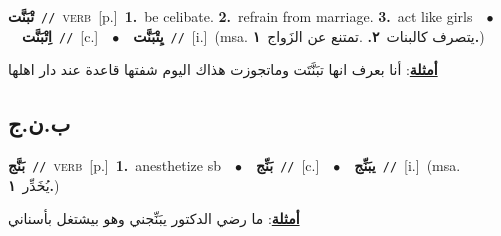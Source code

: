 \documentclass[10pt,a4paper,twoside]{article} %
\begin{document}
\begin{multicols}{2}
{\setlength\topsep{0pt}\textbf{\foreignlanguage{arabic}{تْبَنَّت}}\ {\color{gray}\texttt{//}\color{black}}\ \textsc{verb}\ [p.]\ \textbf{1.}~be celibate.  \textbf{2.}~refrain from marriage.  \textbf{3.}~act like girls\ \ $\bullet$\ \ \setlength\topsep{0pt}\textbf{\foreignlanguage{arabic}{اِتْبَنَّت}}\ {\color{gray}\texttt{//}\color{black}}\ [c.]\ \ $\bullet$\ \ \setlength\topsep{0pt}\textbf{\foreignlanguage{arabic}{يِتْبَنَّت}}\ {\color{gray}\texttt{//}\color{black}}\ [i.]\ \color{gray}(msa. \foreignlanguage{arabic}{يتصرف كالبنات}~\foreignlanguage{arabic}{\textbf{٢.}}  .\foreignlanguage{arabic}{تمتنع عن الزَواج}~\foreignlanguage{arabic}{\textbf{١.}})\color{black}\  \begin{flushright}\color{gray}\foreignlanguage{arabic}{\textbf{\underline{\foreignlanguage{arabic}{أمثلة}}}: أنا بعرف انها تبَنَّتَت وماتجوزت هذاك اليوم شفتها قاعدة عند دار اهلها}\end{flushright}\color{black}} \vspace{2mm}

\vspace{-3mm}
\subsection*{\color{blue}\foreignlanguage{arabic}{ب.ن.ج}\color{blue}{}} 

{\setlength\topsep{0pt}\textbf{\foreignlanguage{arabic}{بَنَّج}}\ {\color{gray}\texttt{//}\color{black}}\ \textsc{verb}\ [p.]\ \textbf{1.}~anesthetize sb\ \ $\bullet$\ \ \setlength\topsep{0pt}\textbf{\foreignlanguage{arabic}{بَنِّج}}\ {\color{gray}\texttt{//}\color{black}}\ [c.]\ \ $\bullet$\ \ \setlength\topsep{0pt}\textbf{\foreignlanguage{arabic}{يبَنِّج}}\ {\color{gray}\texttt{//}\color{black}}\ [i.]\ \color{gray}(msa. \foreignlanguage{arabic}{يُخَدِّر}~\foreignlanguage{arabic}{\textbf{١.}})\color{black}\  \begin{flushright}\color{gray}\foreignlanguage{arabic}{\textbf{\underline{\foreignlanguage{arabic}{أمثلة}}}: ما رضي الدكتور يبَنِّجني وهو بيشتغل بأسناني}\end{flushright}\color{black}} \vspace{2mm}


\end{multicols}
\end{document}
